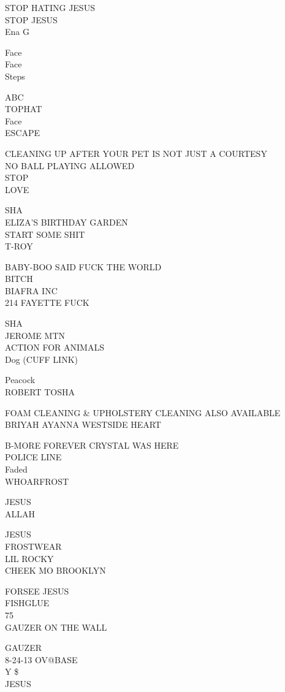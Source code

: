 \documentclass[10pt,letterpaper]{article}
\begin{document}
STOP HATING JESUS\\
STOP JESUS\\
Ena G

Face\\
Face\\
Steps

ABC\\
TOPHAT\\
Face\\
ESCAPE

CLEANING UP AFTER YOUR PET IS NOT JUST A COURTESY\\
NO BALL PLAYING ALLOWED\\
STOP\\
LOVE

SHA\\
ELIZA'S BIRTHDAY GARDEN\\
START SOME SHIT\\
T{-}ROY

BABY{-}BOO SAID FUCK THE WORLD\\
BITCH\\
BIAFRA INC\\
214 FAYETTE FUCK

SHA\\
JEROME MTN\\
ACTION FOR ANIMALS\\
Dog (CUFF LINK)

Peacock\\
ROBERT TOSHA

FOAM CLEANING \& UPHOLSTERY CLEANING ALSO AVAILABLE\\
BRIYAH AYANNA WESTSIDE HEART

B{-}MORE FOREVER CRYSTAL WAS HERE\\
POLICE LINE\\
Faded\\
WHOARFROST

JESUS\\
ALLAH

JESUS\\
FROSTWEAR\\
LIL ROCKY\\
CHEEK MO BROOKLYN

FORSEE JESUS\\
FISHGLUE\\
75\\
GAUZER ON THE WALL

GAUZER\\
8{-}24{-}13 OV@BASE\\
Y \$\\
JESUS
\end{document}
